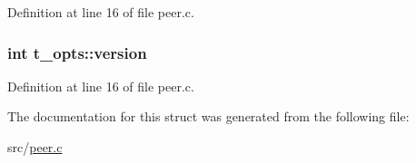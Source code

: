 Definition at line 16 of file peer.\-c.

\hypertarget{structt__opts_a678ae91135fbeaf408cc1ca4ee076202}{
\subsubsection[{version}]{\setlength{\rightskip}{0pt plus 5cm}int t\-\_\-opts\-::version}}\label{structt__opts_a678ae91135fbeaf408cc1ca4ee076202}


Definition at line 16 of file peer.\-c.



The documentation for this struct was generated from the following file\-:\begin{DoxyCompactItemize}
\item 
src/\hyperlink{peer_8c}{peer.\-c}\end{DoxyCompactItemize}
